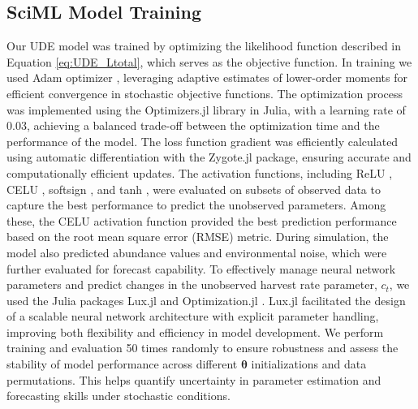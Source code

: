 \documentclass[openacc]{rsproca_new}%
\newcommand{\bs}[1]{\boldsymbol{#1}}
\begin{document}
\subsection{SciML Model Training}
Our UDE model was trained by optimizing the likelihood function described in Equation \eqref{eq:UDE_Ltotal}, which serves as the objective function. In training we used Adam optimizer \cite{kingma2014adam}, leveraging adaptive estimates of lower-order moments for efficient convergence in stochastic objective functions. The optimization process was implemented using the Optimizers.jl \cite{ma2021comparison} library in Julia, with a learning rate of 0.03, achieving a balanced trade-off between the optimization time and the performance of the model. The loss function gradient was efficiently calculated using automatic differentiation with the Zygote.jl \cite{innes2018zygote} package, ensuring accurate and computationally efficient updates.
% 
The activation functions, including ReLU \cite{nair_rectified_2010}, CELU \cite{barron_continuously_2017}, softsign \cite{glorot2010understanding}, and tanh \cite{lecun2002efficient}, were evaluated on subsets of observed data to capture the best performance to predict the unobserved parameters. Among these, the CELU activation function provided the best prediction performance based on the root mean square error (RMSE) metric. During simulation, the model also predicted abundance values and environmental noise, which were further evaluated for forecast capability.
% 
To effectively manage neural network parameters and predict changes in the unobserved harvest rate parameter, $c_t$, we used the Julia packages Lux.jl \cite{pal2023lux} and Optimization.jl \cite{vaibhav_kumar_dixit_2023_7738525}. Lux.jl facilitated the design of a scalable neural network architecture with explicit parameter handling, improving both flexibility and efficiency in model development. 
% 
We perform training and evaluation 50 times randomly to ensure robustness and assess the stability of model performance across different $\bs{\theta}$ initializations and data permutations. This helps quantify uncertainty in parameter estimation and forecasting skills under stochastic conditions. 
% 
% 
\end{document}
